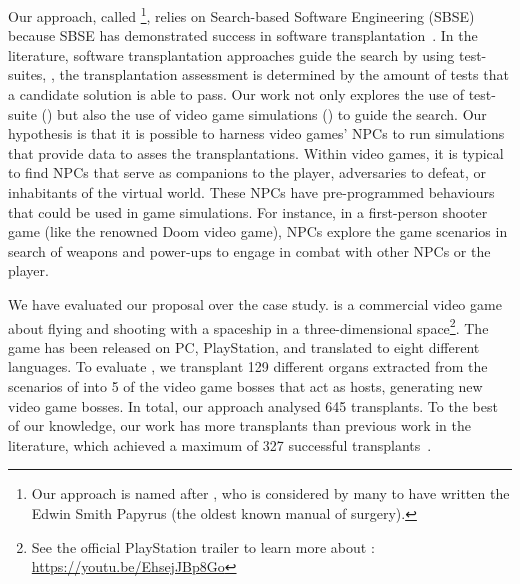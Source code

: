 
Our approach, called \ApproachName{}\footnote{Our approach is named after \ApproachName{}, who is considered by many to have written the Edwin Smith Papyrus (the oldest known manual of surgery).}, relies on Search-based Software Engineering (SBSE) because SBSE has demonstrated success in software transplantation~\cite{barr2015automated}. In the literature, software transplantation approaches guide the search by using test-suites, \ie, the transplantation assessment is determined by the amount of tests that a candidate solution is able to pass. Our work not only explores the use of test-suite (\timhotep{}) but also the use of video game simulations (\simhotep{}) to guide the search.  Our hypothesis is that it is possible to harness video games' NPCs to run simulations that provide data to asses the transplantations. Within video games, it is typical to find NPCs that serve as companions to the player, adversaries to defeat, or inhabitants of the virtual world. These NPCs have pre-programmed behaviours that could be used in game simulations. For instance, in a first-person shooter game (like the renowned Doom video game), NPCs explore the game scenarios in search of weapons and power-ups to engage in combat with other NPCs or the player.

We have evaluated our proposal over the \CaseStudy{} case study. \CaseStudy{} is a commercial video game about flying and shooting with a spaceship in a three-dimensional space\footnote{See the official PlayStation trailer to learn more about \CaseStudy{}: \url{https://youtu.be/EhsejJBp8Go}}. The game has been released on PC, PlayStation, and translated to eight different languages.
To evaluate \ApproachName{}, we transplant 129 different organs extracted from the scenarios of \CaseStudy{} into 5 of the video game bosses that act as hosts, generating new video game bosses. 
In total, our approach analysed 645 transplants. To the best of our knowledge, our work has more transplants than previous work in the literature, which achieved a maximum of 327 successful transplants~\cite{reid2020optimising}. 


